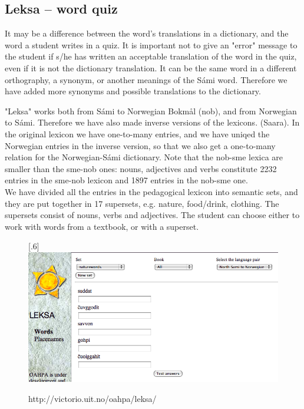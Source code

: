 \documentclass[a4paper,12pt]{article}
\begin{document}
\subsection{Leksa -- word quiz}
It may be a difference between the word's translations in a dictionary, and the word a student writes in a quiz. It is important not to give an "error" message to the student if s/he has written an acceptable translation of the word in the quiz, even if it is not the dictionary translation. It can be the same word in a different orthography, a synonym, or another meanings of the Sámi word. Therefore we have added more synonyms and possible translations to the dictionary.

"Leksa" works both from Sámi to Norwegian Bokmål (nob), and from Norwegian to Sámi. Therefore we have also made inverse versions of the lexicons. (Saara). In the original lexicon we have one-to-many entries, and we have uniqed the Norwegian entries in the inverse version, so that we also get a one-to-many relation for the Norwegian-Sámi dictionary. Note that the nob-sme lexica are smaller than the sme-nob ones: nouns, adjectives and verbs constitute 2232 entries in the sme-nob lexicon and 1897 entries in the nob-sme one.\\ 

We have divided all the entries in the pedagogical lexicon into semantic sets, and they are put together in 17 supersets, e.g. nature, food/drink, clothing. The supersets consist of nouns, verbs and adjectives. The student can choose either to work with words from a textbook, or with a superset. 
\vspace{0.5cm}

\begin{figure}[htbp]
\begin{center}
\scalebox{.6}[.6]{\includegraphics{img/leksa.png}}\\
\caption{http://victorio.uit.no/oahpa/leksa/}
\label{leksa}
\end{center}
\end{figure}
\end{document}
